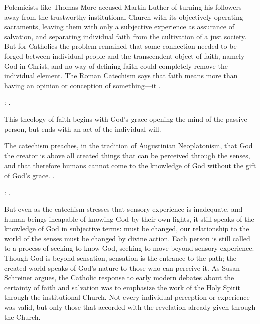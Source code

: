 Polemicists like Thomas More accused Martin Luther of turning his followers away from the trustworthy institutional Church with its objectively operating sacraments, leaving them with only a subjective experience as assurance of salvation, and separating individual faith from the cultivation of a just society.%
\Autocite[ch.~4]{Schreiner:Certainty}
But for Catholics the problem remained that some connection needed to be forged between individual people and the transcendent object of faith, namely God in Christ, and no way of defining faith could completely remove the individual element.
The Roman Catechism says that faith means more than having an opinion or conception of something---it .%
\begin{Footnote}
  \Autocite[15]{Catholic:Catechismus1614}: .
\end{Footnote}
This theology of faith begins with God's grace opening the mind of the passive person, but ends with an act of the individual will.

The catechism preaches, in the tradition of Augustinian Neoplatonism, that God the creator is above all created things that can be perceived through the senses, and that therefore humans cannot come to the knowledge of God without the gift of God's grace.
.%
\begin{Footnote}
  \Autocite[18]{Catholic:Catechismus1614}: .
\end{Footnote}
But even as the catechism stresses that sensory experience is inadequate, and human beings incapable of knowing God by their own lights, it still speaks of the knowledge of God in subjective terms:  must be changed, our relationship to the world of the senses must be changed by divine action.
Each person is still called to a process of seeking to know God, seeking to move beyond sensory experience.
Though God is beyond sensation, sensation is the entrance to the path; the created world speaks of God's nature to those who can perceive it.
As Susan Schreiner argues, the Catholic response to early modern debates about the certainty of faith and salvation was to emphasize the work of the Holy Spirit through the institutional Church. %
Not every individual perception or experience was valid, but only those that accorded with the revelation already given through the Church.

